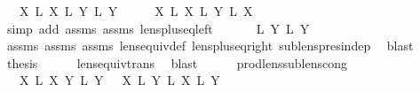 \begin{isabellebody}
\ \ \ {\isachardoublequoteopen}X\ {\isacharplus}\isactrlsub L\ X\ {\isasymapprox}\isactrlsub L\ Y\ {\isacharplus}\isactrlsub L\ Y\isanewline
%
\isadelimproof
%
\endisadelimproof
%
\isatagproof
{}\isamarkupfalse%
\ {\isacharminus}\isanewline
\ \ \isamarkupfalse%
\ {\isachardoublequoteopen}X\ {\isacharplus}\isactrlsub L\ X\ {\isasymapprox}\isactrlsub L\ Y\ {\isacharplus}\isactrlsub L\ X\isanewline
\ \ \ \ \isamarkupfalse%
\ {\isacharparenleft}simp\ add{\isacharcolon}\ assms{\isacharparenleft}{}{\isacharparenright}\ assms{\isacharparenleft}{}{\isacharparenright}\ lens{\isacharunderscore}plus{\isacharunderscore}eq{\isacharunderscore}left{\isacharparenright}\isanewline
\ \ \isamarkupfalse%
\ \isamarkupfalse%
\ {\isachardoublequoteopen}{\isachardot}{\isachardot}{\isachardot}\ {\isasymapprox}\isactrlsub L\ Y\ {\isacharplus}\isactrlsub L\ Y\isanewline
\ \ \ \ \isamarkupfalse%
\ assms{\isacharparenleft}{}{\isacharparenright}\ assms{\isacharparenleft}{}{\isacharparenright}\ assms{\isacharparenleft}{}{\isacharparenright}\ lens{\isacharunderscore}equiv{\isacharunderscore}def\ lens{\isacharunderscore}plus{\isacharunderscore}eq{\isacharunderscore}right\ sublens{\isacharunderscore}pres{\isacharunderscore}indep\ \isamarkupfalse%
\ blast\isanewline
\ \ \isamarkupfalse%
\ \isamarkupfalse%
\ {\isacharquery}thesis\isanewline
\ \ \ \ \isamarkupfalse%
\ lens{\isacharunderscore}equiv{\isacharunderscore}trans\ \isamarkupfalse%
\ blast\isanewline
{}\isamarkupfalse%
%
\endisatagproof
{\isafoldproof}%
%
\isadelimproof
\isanewline
%
\endisadelimproof
\ \ \ \ \isanewline
{}\isamarkupfalse%
\ prod{\isacharunderscore}lens{\isacharunderscore}sublens{\isacharunderscore}cong{\isacharcolon}\isanewline
\ \ {\isachardoublequoteopen}{\isasymlbrakk}\ X\ {\isasymsubseteq}\isactrlsub L\ X\ Y\ {\isasymsubseteq}\isactrlsub L\ Y\ {\isasymrbrakk}\ {\isasymLongrightarrow}\ {\isacharparenleft}X\ {\isasymtimes}\isactrlsub L\ Y\ {\isasymsubseteq}\isactrlsub L\ {\isacharparenleft}X\ {\isasymtimes}\isactrlsub L\ Y\isanewline

\end{isabellebody}

